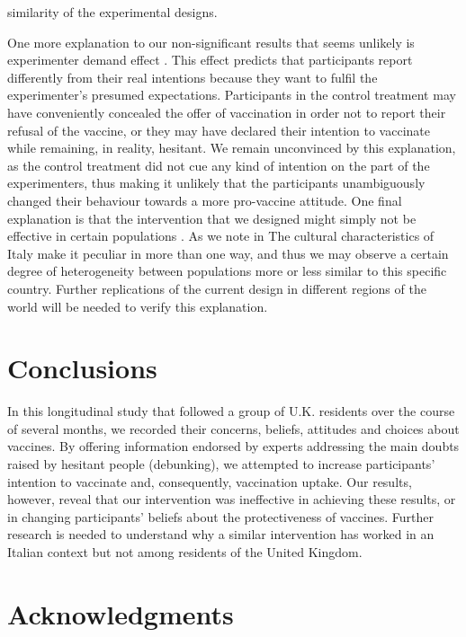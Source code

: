 \documentclass[authordate, empirical]{jote-new-article}
\begin{document}
similarity of the experimental designs.



	One more explanation to our non-significant results that seems unlikely is experimenter demand effect \parencites{Zizzo2009}. This effect predicts that participants report differently from their real intentions because they want to fulfil the experimenter's presumed expectations. Participants in the control treatment may have conveniently concealed the offer of vaccination in order not to report their refusal of the vaccine, or they may have declared their intention to vaccinate while remaining, in reality, hesitant. We remain unconvinced by this explanation, as the control treatment did not cue any kind of intention on the part of the experimenters, thus making it unlikely that the participants unambiguously changed their behaviour towards a more pro-vaccine attitude. One final explanation is that the intervention that we designed might simply not be effective in certain populations \parencites{Bryan2021}. As we note in \textcite{Ronzani2022} The cultural characteristics of Italy make it peculiar in more than one way, and thus we may observe a certain degree of heterogeneity between populations more or less similar to this specific country. Further replications of the current design in different regions of the world will be needed to verify this explanation.




	\section{Conclusions}



	In this longitudinal study that followed a group of U.K. residents over the course of several months, we recorded their concerns, beliefs, attitudes and choices about vaccines. By offering information endorsed by experts addressing the main doubts raised by hesitant people (debunking), we attempted to increase participants' intention to vaccinate and, consequently, vaccination uptake. Our results, however, reveal that our intervention was ineffective in achieving these results, or in changing participants' beliefs about the protectiveness of vaccines. Further research is needed to understand why a similar intervention has worked in an Italian context but not among residents of the United Kingdom.



	\section{Acknowledgments}
\end{document}
